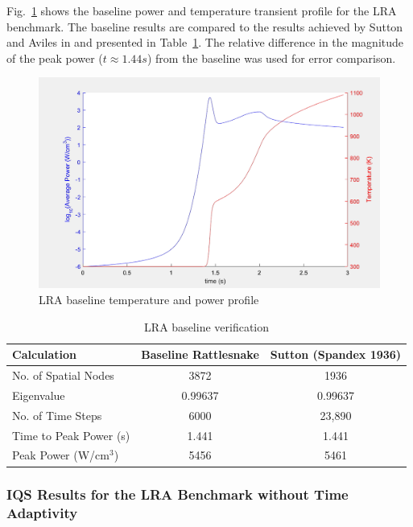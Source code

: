 \documentclass{elsarticle}
\newcommand{\fig}[1]{Fig.~\ref{#1}}                      %
\newcommand{\tbl}[1]{Table~\ref{#1}}                     %
\begin{document}
\fig{fig:lra_profile} shows the baseline power and temperature transient profile for the LRA benchmark. The baseline results are compared to the results achieved by Sutton and Aviles in \cite{Sutton_1996} and presented in \tbl{tab:base}.  The relative difference in the magnitude of the peak power ($t\approx1.44 s$) from the baseline was used for error comparison.  

\begin{figure}[htbp!]
\centering
\includegraphics[width=\linewidth]{figures/lra_profile.png}
\caption{LRA baseline temperature and power profile}
\label{fig:lra_profile}
\end{figure}

\begin{table}[!htbp]
\begin{center}
\caption{LRA baseline verification}
\label{tab:base}
\begin{tabular}{|l||c|c|}
\hline
Calculation   &  Baseline Rattlesnake & Sutton (Spandex 1936) \\
\hline\hline
No. of Spatial Nodes	& 3872 		& 1936 \\
Eigenvalue 				& 0.99637	& 0.99637 \\
No. of Time Steps 		& 6000 		& 23,890 \\
Time to Peak Power (s) 	& 1.441 	& 1.441 \\
Peak Power (W/cm$^3$) 	& 5456 		& 5461 \\
\hline
\end{tabular}
\end{center}
\end{table}

\subsubsection{IQS Results for the LRA Benchmark without Time Adaptivity}
\end{document}
